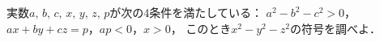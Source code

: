 \documentclass[../../main.tex]{subfiles}
\begin{document}
実数$a, \, b, \, c, \, x, \, y, \, z, \, p$が次の4条件を満たしている：
$a^2-b^2-c^2>0$，$ax+by+cz=p$，$ap<0$，$x>0$，
このとき$x^2-y^2-z^2$の符号を調べよ．
\end{document}
